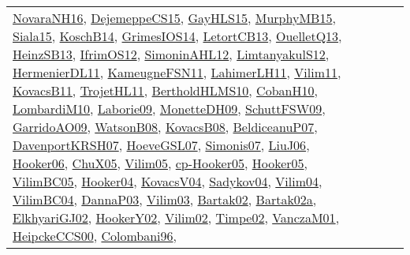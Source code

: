 {\begin{longtable}{lp{3cm}>{\raggedright}p{6cm}>{\raggedright}p{6cm}p{8cm}}
\href{articles/NovaraNH16.pdf}{NovaraNH16}\cite{NovaraNH16}, \href{papers/DejemeppeCS15.pdf}{DejemeppeCS15}\cite{DejemeppeCS15}, \href{papers/GayHLS15.pdf}{GayHLS15}\cite{GayHLS15}, \href{papers/MurphyMB15.pdf}{MurphyMB15}\cite{MurphyMB15}, \href{articles/Siala15.pdf}{Siala15}\cite{Siala15}, \href{papers/KoschB14.pdf}{KoschB14}\cite{KoschB14}, \href{articles/GrimesIOS14.pdf}{GrimesIOS14}\cite{GrimesIOS14}, \href{papers/LetortCB13.pdf}{LetortCB13}\cite{LetortCB13}, \href{papers/OuelletQ13.pdf}{OuelletQ13}\cite{OuelletQ13}, \href{articles/HeinzSB13.pdf}{HeinzSB13}\cite{HeinzSB13}, \href{papers/IfrimOS12.pdf}{IfrimOS12}\cite{IfrimOS12}, \href{papers/SimoninAHL12.pdf}{SimoninAHL12}\cite{SimoninAHL12}, \href{articles/LimtanyakulS12.pdf}{LimtanyakulS12}\cite{LimtanyakulS12}, \href{papers/HermenierDL11.pdf}{HermenierDL11}\cite{HermenierDL11}, \href{papers/KameugneFSN11.pdf}{KameugneFSN11}\cite{KameugneFSN11}, \href{papers/LahimerLH11.pdf}{LahimerLH11}\cite{LahimerLH11}, \href{papers/Vilim11.pdf}{Vilim11}\cite{Vilim11}, \href{articles/KovacsB11.pdf}{KovacsB11}\cite{KovacsB11}, \href{articles/TrojetHL11.pdf}{TrojetHL11}\cite{TrojetHL11}, \href{papers/BertholdHLMS10.pdf}{BertholdHLMS10}\cite{BertholdHLMS10}, \href{papers/CobanH10.pdf}{CobanH10}\cite{CobanH10}, \href{papers/LombardiM10.pdf}{LombardiM10}\cite{LombardiM10}, \href{papers/Laborie09.pdf}{Laborie09}\cite{Laborie09}, \href{papers/MonetteDH09.pdf}{MonetteDH09}\cite{MonetteDH09}, \href{papers/SchuttFSW09.pdf}{SchuttFSW09}\cite{SchuttFSW09}, \href{articles/GarridoAO09.pdf}{GarridoAO09}\cite{GarridoAO09}, \href{papers/WatsonB08.pdf}{WatsonB08}\cite{WatsonB08}, \href{articles/KovacsB08.pdf}{KovacsB08}\cite{KovacsB08}, \href{papers/BeldiceanuP07.pdf}{BeldiceanuP07}\cite{BeldiceanuP07}, \href{papers/DavenportKRSH07.pdf}{DavenportKRSH07}\cite{DavenportKRSH07}, \href{papers/HoeveGSL07.pdf}{HoeveGSL07}\cite{HoeveGSL07}, \href{articles/Simonis07.pdf}{Simonis07}\cite{Simonis07}, \href{papers/LiuJ06.pdf}{LiuJ06}\cite{LiuJ06}, \href{articles/Hooker06.pdf}{Hooker06}\cite{Hooker06}, \href{papers/ChuX05.pdf}{ChuX05}\cite{ChuX05}, \href{papers/Vilim05.pdf}{Vilim05}\cite{Vilim05}, \href{papers/cp-Hooker05.pdf}{cp-Hooker05}\cite{cp-Hooker05}, \href{articles/Hooker05.pdf}{Hooker05}\cite{Hooker05}, \href{articles/VilimBC05.pdf}{VilimBC05}\cite{VilimBC05}, \href{papers/Hooker04.pdf}{Hooker04}\cite{Hooker04}, \href{papers/KovacsV04.pdf}{KovacsV04}\cite{KovacsV04}, \href{papers/Sadykov04.pdf}{Sadykov04}\cite{Sadykov04}, \href{papers/Vilim04.pdf}{Vilim04}\cite{Vilim04}, \href{papers/VilimBC04.pdf}{VilimBC04}\cite{VilimBC04}, \href{papers/DannaP03.pdf}{DannaP03}\cite{DannaP03}, \href{papers/Vilim03.pdf}{Vilim03}\cite{Vilim03}, \href{papers/Bartak02.pdf}{Bartak02}\cite{Bartak02}, \href{papers/Bartak02a.pdf}{Bartak02a}\cite{Bartak02a}, \href{papers/ElkhyariGJ02.pdf}{ElkhyariGJ02}\cite{ElkhyariGJ02}, \href{papers/HookerY02.pdf}{HookerY02}\cite{HookerY02}, \href{papers/Vilim02.pdf}{Vilim02}\cite{Vilim02}, \href{articles/Timpe02.pdf}{Timpe02}\cite{Timpe02}, \href{papers/VanczaM01.pdf}{VanczaM01}\cite{VanczaM01}, \href{articles/HeipckeCCS00.pdf}{HeipckeCCS00}\cite{HeipckeCCS00}, \href{papers/Colombani96.pdf}{Colombani96}\cite{Colombani96}, 
\end{longtable}}
